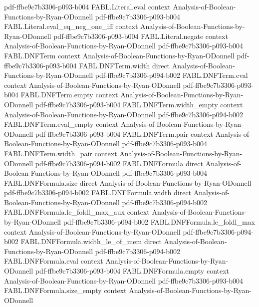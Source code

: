 \begin{theorem}
  {pdf-ffbe9c7b3306-p093-b004}
\proofstep
  {FABL.Literal.eval}
  {context}
  {Analysis-of-Boolean-Functions-by-Ryan-ODonnell}
  {pdf-ffbe9c7b3306-p093-b004}
\proofstep
  {FABL.Literal.eval_eq_neg_one_iff}
  {context}
  {Analysis-of-Boolean-Functions-by-Ryan-ODonnell}
  {pdf-ffbe9c7b3306-p093-b004}
\proofstep
  {FABL.Literal.negate}
  {context}
  {Analysis-of-Boolean-Functions-by-Ryan-ODonnell}
  {pdf-ffbe9c7b3306-p093-b004}
\proofstep
  {FABL.DNFTerm}
  {context}
  {Analysis-of-Boolean-Functions-by-Ryan-ODonnell}
  {pdf-ffbe9c7b3306-p093-b004}
\proofstep
  {FABL.DNFTerm.width}
  {direct}
  {Analysis-of-Boolean-Functions-by-Ryan-ODonnell}
  {pdf-ffbe9c7b3306-p094-b002}
\proofstep
  {FABL.DNFTerm.eval}
  {context}
  {Analysis-of-Boolean-Functions-by-Ryan-ODonnell}
  {pdf-ffbe9c7b3306-p093-b004}
\proofstep
  {FABL.DNFTerm.empty}
  {context}
  {Analysis-of-Boolean-Functions-by-Ryan-ODonnell}
  {pdf-ffbe9c7b3306-p093-b004}
\proofstep
  {FABL.DNFTerm.width_empty}
  {context}
  {Analysis-of-Boolean-Functions-by-Ryan-ODonnell}
  {pdf-ffbe9c7b3306-p094-b002}
\proofstep
  {FABL.DNFTerm.eval_empty}
  {context}
  {Analysis-of-Boolean-Functions-by-Ryan-ODonnell}
  {pdf-ffbe9c7b3306-p093-b004}
\proofstep
  {FABL.DNFTerm.pair}
  {context}
  {Analysis-of-Boolean-Functions-by-Ryan-ODonnell}
  {pdf-ffbe9c7b3306-p093-b004}
\proofstep
  {FABL.DNFTerm.width_pair}
  {context}
  {Analysis-of-Boolean-Functions-by-Ryan-ODonnell}
  {pdf-ffbe9c7b3306-p094-b002}
\proofstep
  {FABL.DNFFormula}
  {direct}
  {Analysis-of-Boolean-Functions-by-Ryan-ODonnell}
  {pdf-ffbe9c7b3306-p093-b004}
\proofstep
  {FABL.DNFFormula.size}
  {direct}
  {Analysis-of-Boolean-Functions-by-Ryan-ODonnell}
  {pdf-ffbe9c7b3306-p094-b002}
\proofstep
  {FABL.DNFFormula.width}
  {direct}
  {Analysis-of-Boolean-Functions-by-Ryan-ODonnell}
  {pdf-ffbe9c7b3306-p094-b002}
\proofstep
  {FABL.DNFFormula.le_foldl_max_aux}
  {context}
  {Analysis-of-Boolean-Functions-by-Ryan-ODonnell}
  {pdf-ffbe9c7b3306-p094-b002}
\proofstep
  {FABL.DNFFormula.le_foldl_max}
  {context}
  {Analysis-of-Boolean-Functions-by-Ryan-ODonnell}
  {pdf-ffbe9c7b3306-p094-b002}
\proofstep
  {FABL.DNFFormula.width_le_of_mem}
  {direct}
  {Analysis-of-Boolean-Functions-by-Ryan-ODonnell}
  {pdf-ffbe9c7b3306-p094-b002}
\proofstep
  {FABL.DNFFormula.eval}
  {context}
  {Analysis-of-Boolean-Functions-by-Ryan-ODonnell}
  {pdf-ffbe9c7b3306-p093-b004}
\proofstep
  {FABL.DNFFormula.empty}
  {context}
  {Analysis-of-Boolean-Functions-by-Ryan-ODonnell}
  {pdf-ffbe9c7b3306-p093-b004}
\proofstep
  {FABL.DNFFormula.size_empty}
  {context}
  {Analysis-of-Boolean-Functions-by-Ryan-ODonnell}

\end{theorem}
